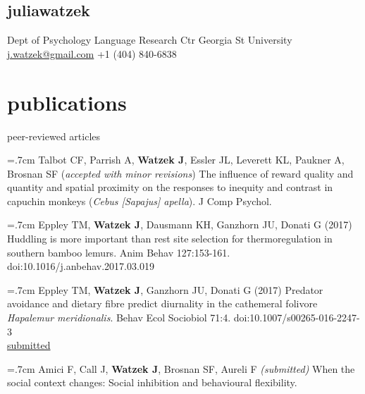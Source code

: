 \documentclass[]{friggeri-cv}
\begin{document}
\begin{aside}
  \section{{\normalfont julia}watzek}
    Dept of Psychology
    Language Research Ctr
    Georgia St University
    ~
    \href{mailto:j.watzek@gmail.com}{j.watzek@gmail.com}
    +1 (404) 840-6838
\end{aside}


\section{publications}


{\subfont\large{} peer-reviewed articles}

\hangindent=.7cm Talbot CF, Parrish A, \textbf{Watzek J}, Essler JL, Leverett KL, Paukner A, Brosnan SF (\emph{accepted with minor revisions}) The influence of reward quality and quantity and spatial proximity on the responses to inequity and contrast in capuchin monkeys (\emph{Cebus [Sapajus] apella}). J Comp Psychol.

\hangindent=.7cm Eppley TM, \textbf{Watzek J}, Dausmann KH, Ganzhorn JU, Donati G (2017) Huddling is more important than rest site selection for thermoregulation in southern bamboo lemurs. Anim Behav 127:153-161. doi:10.1016/j.anbehav.2017.03.019

\hangindent=.7cm Eppley TM, \textbf{Watzek J}, Ganzhorn JU, Donati G (2017) Predator avoidance and dietary fibre predict diurnality in the cathemeral folivore \emph{Hapalemur meridionalis}. Behav Ecol Sociobiol 71:4. doi:10.1007/s00265-016-2247-3 \\[-.1cm]


\hspace{.35cm} { \underline{submitted}}

\hangindent=.7cm Amici F, Call J, \textbf{Watzek J}, Brosnan SF, Aureli F \emph{(submitted)} When the social context changes: Social inhibition and behavioural flexibility.
\end{document}
